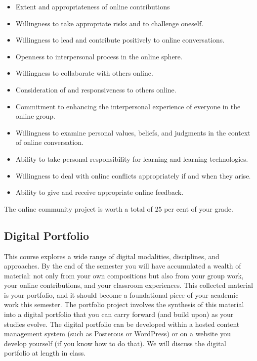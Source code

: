 \documentclass[letterpaper,10pt,headsepline]{scrreprt}
\begin{document}
\begin{itemize}
\item Extent and appropriateness of online contributions
\item Willingness to take appropriate risks and to challenge oneself.
\item Willingness to lead and contribute positively to online conversations.
\item Openness to interpersonal process in the online sphere.
\item Willingness to collaborate with others online.
\item Consideration of and responsiveness to others online.
\item Commitment to enhancing the interpersonal experience of everyone in the online group.
\item Willingness to examine personal values, beliefs, and judgments in the context of online conversation.
\item Ability to take personal responsibility for learning and learning technologies.
\item Willingness to deal with online conflicts appropriately if and when they arise.
\item Ability to give and receive appropriate online feedback.
 
\end{itemize}

The online community project is worth a total of 25 per cent of your grade.

\subsection{Digital Portfolio}

This course explores a wide range of digital modalities, disciplines, and approaches. By the end of the semester you will have accumulated a wealth of material: not only from your own compositions but also from your group work, your online contributions, and your classroom experiences. This collected material is your portfolio, and it should become a foundational piece of your academic work this semester. The portfolio project involves the synthesis of this material into a digital portfolio that you can carry forward (and build upon) as your studies evolve. The digital portfolio can be developed within a hosted content management system (such as Posterous or WordPress) or on a website you develop yourself (if you know how to do that). We will discuss the digital portfolio at length in class.
\end{document}
